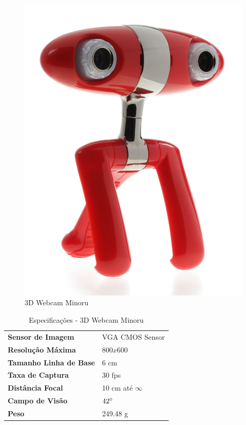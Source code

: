 \begin{figure}[H]
 	\centering
 	\includegraphics[scale=0.10]{./Resources/minoru.jpg}
 	\caption{3D Webcam Minoru}
 	\label{minoru}
\end{figure}

\begin{table}[]
\centering
\caption{Especificações - 3D Webcam Minoru}
\label{minoru_tab}
\begin{tabular}{ll}
\textbf{Sensor de Imagem}      & VGA CMOS Sensor  	\\
\textbf{Resolução Máxima}      & $800x600$        	\\
\textbf{Tamanho Linha de Base} & 6 cm             	\\
\textbf{Taxa de Captura}       & 30 fps             	\\
\textbf{Distância Focal}       & 10 cm até $\infty$	\\
\textbf{Campo de Visão}        & $42\degree$		   	\\
\textbf{Peso}				  & 249.48 g				\\
\end{tabular}
\end{table}

